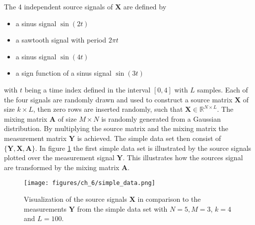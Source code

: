 The 4 independent source signals of $\mathbf{X}$ are defined by 
\begin{itemize}
\item[1.] a sinus signal $\sin(2t)$
\item[2.] a sawtooth signal with period $2 \pi t$
\item[3.] a sinus signal $\sin(4t)$
\item[4.] a sign function of a sinus signal $\sin(3t)$
\end{itemize}
with $t$ being a time index defined in the interval $[0,4]$ with $L$ samples. Each of the four signals are randomly drawn and used to construct a source matrix $\mathbf{X}$ of size $k \times L$, then zero rows are inserted randomly, such that $\mathbf{X} \in \mathbb{R}^{N \times L}$. 
The mixing matrix $\mathbf{A}$ of size $M \times N$ is randomly generated from a Gaussian distribution. 
By multiplying the source matrix and the mixing matrix the measurement matrix $\mathbf{Y}$ is achieved.
The simple data set then consist of $\{ \mathbf{Y}, \mathbf{X}, \mathbf{A} \}$.
In figure \ref{fig:simple} the first simple data set is illustrated by the source signals plotted over the measurement signal $\mathbf{Y}$. This illustrates how the sources signal are transformed by the mixing matrix $\mathbf{A}$.
\begin{figure}[H]
\centering
\texttt{[image: figures/ch\_6/simple\_data.png]}
\caption{Visualization of the source signals $\mathbf{X}$ in comparison to the measurements $\mathbf{Y}$ from the simple data set with $N = 5, M = 3$, $k = 4$ and $L=100$.}
\label{fig:simple}
\end{figure}
\noindent

